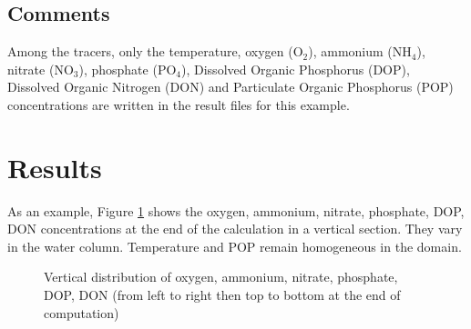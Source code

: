 \subsection{Comments}
Among the tracers, only the temperature, oxygen (O$_2$), ammonium (NH$_4$),
nitrate (NO$_3$), phosphate (PO$_4$), Dissolved Organic Phosphorus (DOP),
Dissolved Organic Nitrogen (DON) and Particulate Organic Phosphorus (POP)
concentrations are written in the result files for this example.

%
\section{Results}

As an example, Figure \ref{fig:waq3d_aed2:res} shows the oxygen, ammonium,
nitrate, phosphate, DOP, DON concentrations at the end of the calculation
in a vertical section.
They vary in the water column.
Temperature and POP remain homogeneous in the domain.



\begin{figure}[H]
\centering
\begin{minipage}[t]{0.3\textwidth}
 \centering
{}
\end{minipage}
%
\begin{minipage}[t]{0.3\textwidth}
 \centering
{}
\end{minipage}
%
\begin{minipage}[t]{0.3\textwidth}
 \centering
{}
\end{minipage}
%
\begin{minipage}[t]{0.3\textwidth}
 \centering
{}
\end{minipage}
%
\begin{minipage}[t]{0.3\textwidth}
 \centering
{}
\end{minipage}
%
\begin{minipage}[t]{0.3\textwidth}
 \centering
{}
\end{minipage}
%
 \caption{Vertical distribution of oxygen, ammonium, nitrate, phosphate, DOP, DON (from left to right then top to bottom at the end of computation)}
 \label{fig:waq3d_aed2:res}
\end{figure}
%
